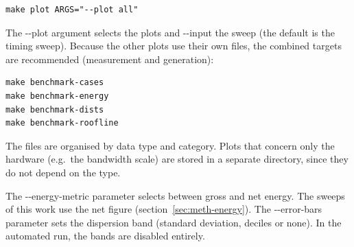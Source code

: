 \begin{verbatim}
make plot ARGS="--plot all"
\end{verbatim}

The -{-}plot argument selects the plots and -{-}input the sweep (the default is
the timing sweep). Because the other plots use their own files, the combined
targets are recommended (measurement and generation):

\begin{verbatim}
make benchmark-cases
make benchmark-energy
make benchmark-dists
make benchmark-roofline
\end{verbatim}

The files are organised by data type and category. Plots that concern only the
hardware (e.g.\ the bandwidth scale) are stored in a separate directory, since
they do not depend on the type.

The -{-}energy-metric parameter selects between gross and net energy. The
sweeps of this work use the net figure (section~\ref{sec:meth-energy}). The
-{-}error-bars parameter sets the dispersion band (standard deviation, deciles
or none). In the automated run, the bands are disabled entirely.
